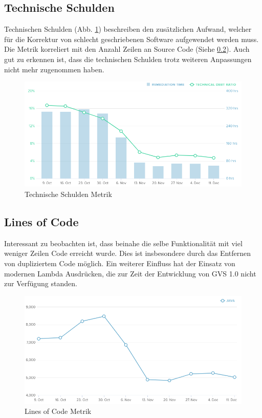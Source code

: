 \documentclass[11pt,a4paper,english,oneside]{book}
\numberwithin{equation}{chapter}
\begin{document}
	\subsection{Technische Schulden}
	Technischen Schulden (Abb. \ref{fig:metric-technical-debt}) beschreiben den zusätzlichen Aufwand, welcher für die Korrektur von schlecht geschriebenen Software aufgewendet werden muss. Die Metrik korreliert mit den Anzahl Zeilen an Source Code (Siehe \ref{ssec:lines-code}). Auch gut zu erkennen ist, dass die technischen Schulden trotz weiteren Anpassungen nicht mehr zugenommen haben.
	\begin{figure}[h!]
		\centering
		\includegraphics[width=\linewidth]{assets/images/metrics/technical_debt}
		\caption{Technische Schulden Metrik}
		\label{fig:metric-technical-debt}
	\end{figure}
	
	\subsection{Lines of Code} \label{ssec:lines-code}
	Interessant zu beobachten ist, dass beinahe die selbe Funktionalität mit viel weniger Zeilen Code erreicht wurde. Dies ist insbesondere durch das Entfernen von dupliziertem Code möglich. Ein weiterer Einfluss hat der Einsatz von modernen Lambda Ausdrücken, die zur Zeit der Entwicklung von GVS 1.0 nicht zur Verfügung standen.
	\begin{figure}[h!]
		\centering
		\includegraphics[width=\linewidth]{assets/images/metrics/lines_of_code}
		\caption{Lines of Code Metrik}
		\label{metric-linesofcode}
	\end{figure}	
\end{document}

